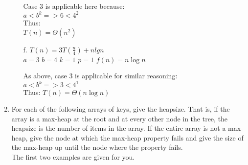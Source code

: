 \documentclass[10pt]{article}
\begin{document}
\begin{enumerate}
\begin{enumerate}
Case 3 is applicable here because: \\
$a < b^{k} => 6 < 4^2$ \\
Thus: \\
$T(n) = \Theta(n^2)$

\vspace{.75in}


\item[f.] $T(n) = 3T(\frac{n}{4}) + nlgn$\\

$a = 3$
$b = 4$
$k = 1$
$p = 1$
$f(n) = n \log n$

As above, case 3 is applicable for similar reasoning: \\
$a < b^{k} => 3 < 4^1$ \\
Thus:
$T(n) = \Theta(n \log n)$

\end{enumerate}

\newpage

\item For each of the following arrays of keys, give the heapsize.  That is, if the array is a max-heap at the root and at every other node in the tree, the heapsize is the number of items in the array.  If the entire array is not a max-heap, give the node at which the max-heap property fails and give the size of the max-heap up until the node where the property fails.\\

The first two examples are given for you.\\


\end{enumerate}
\end{document}
